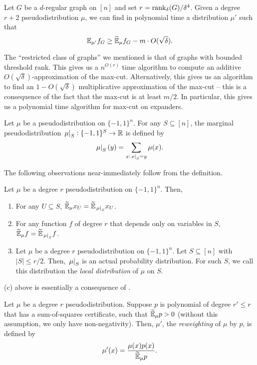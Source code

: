 	\begin{ftheo}
		Let $G$ be a $d$-regular graph on $[n]$ and set $r = \operatorname{rank}_{\delta}(G)/\delta^4$. Given a degree $r+2$ pseudodistribution $\mu$, we can find in polynomial time a distribution $\mu'$ such that
		\[ \mathbb{E}_{\mu'} f_G \ge \widetilde{\mathbb{E}}_{\mu} f_G - m\cdot O(\sqrt{\delta}). \]
	\end{ftheo}
	The ``restricted class of graphs'' we mentioned is that of graphs with bounded threshold rank. This gives us a $n^{O(r)}$ time algorithm to compute an additive $O(\sqrt{\delta})$-approximation of the max-cut. Alternatively, this gives us an algorithm to find an $1-O(\sqrt{\delta})$ multiplicative approximation of the max-cut -- this is a consequence of the fact that the max-cut is at least $m/2$. In particular, this gives us a polynomial time algorithm for max-cut on expanders.

	\begin{fdef}
		Let $\mu$ be a pseudodistribution on $\{-1,1\}^n$. For any $S \subseteq [n]$, the marginal pseudodistribution $\left.\mu\right|_{S} : \{-1,1\}^S \to \mathbb{R}$ is defined by
		\[ \left.\mu\right|_{S}(y) = \sum_{x : \left.x\right|_{S} = y} \mu(x). \]
	\end{fdef}

	The following observations near-immediately follow from the definition.
	\begin{fprop}
		\label{prop:marginal-facts}
		Let $\mu$ be a degree $r$ pseudodistribution on $\{-1,1\}^n$. Then,
		\begin{enumerate}[label=(\alph*)]
			\item For any $U \subseteq S$, $\widetilde{\mathbb{E}}_\mu x_U = \widetilde{\mathbb{E}}_{\left.\mu\right|_{S}} x_U$.
			\item For any function $f$ of degree $r$ that depends only on variables in $S$, $\widetilde{\mathbb{E}}_\mu f = \widetilde{\mathbb{E}}_{\left.\mu\right|_{S}} f$.
			\item Let $\mu$ be a degree $r$ pseudodistribution on $\{-1,1\}^n$. Let $S \subseteq [n]$ with $|S| \le r/2$. Then, $\left.\mu\right|_{S}$ is an actual probability distribution. For such $S$, we call this distribution the \emph{local distribution} of $\mu$ on $S$.
		\end{enumerate}
	\end{fprop}
	(c) above is essentially a consequence of . 

	\begin{fdef}[Reweighting]
		Let $\mu$ be a degree $r$ pseudodistribution. Suppose $p$ is polynomial of degree $r' \le r$ that has a sum-of-squares certificate, such that $\widetilde{\mathbb{E}}_\mu p > 0$ (without this assumption, we only have non-negativity). Then, $\mu'$, the \emph{reweighting} of $\mu$ by $p$, is defined by
		\[ \mu'(x) = \frac{\mu(x) p(x)}{\widetilde{\mathbb{E}}_\mu p}. \]
	\end{fdef}

